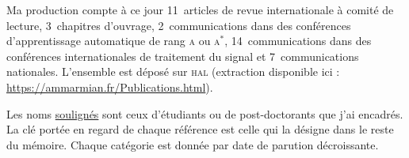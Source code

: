 Ma production compte à ce jour 11~articles de revue internationale à comité de
lecture, 3~chapitres d'ouvrage, 2~communications dans des conférences
d'apprentissage automatique de rang \textsc{a} ou \textsc{a}$^\ast$,
14~communications dans des conférences internationales de traitement du signal
et 7~communications nationales. L'ensemble est déposé sur \textsc{hal}
(extraction disponible ici : \url{https://ammarmian.fr/Publications.html}).

Les noms \underline{soulignés} sont ceux d'étudiants ou de post-doctorants que
j'ai encadrés. La clé portée en regard de chaque référence est celle qui la
désigne dans le reste du mémoire. Chaque catégorie est donnée par date de
parution décroissante.


\begin{cvpublist}
\end{cvpublist}


\begin{cvpublist}
\end{cvpublist}


\begin{cvpublist}
\end{cvpublist}


\begin{cvpublist}
\end{cvpublist}


\begin{cvpublist}
\end{cvpublist}

